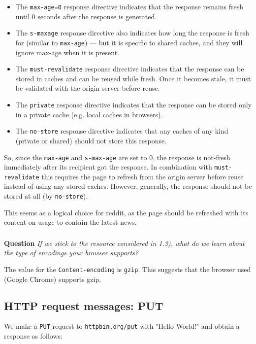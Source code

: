 \documentclass{article}
\begin{document}
\begin{itemize}
    \item The \texttt{max-age=0} response directive indicates that the response remains fresh until 0 seconds after the response is generated.
    \item The \texttt{s-maxage} response directive also indicates how long the response is fresh for (similar to \texttt{max-age}) — but it is specific to shared caches, and they will ignore max-age when it is present.
    \item The \texttt{must-revalidate} response directive indicates that the response can be stored in caches and can be reused while fresh. Once it becomes stale, it must be validated with the origin server before reuse.
    \item The \texttt{private} response directive indicates that the response can be stored only in a private cache (e.g. local caches in browsers).
    \item The \texttt{no-store} response directive indicates that any caches of any kind (private or shared) should not store this response.
\end{itemize}


So, since the \texttt{max-age} and \texttt{s-max-age} are set to 0, the response is not-fresh immediately after its recipient got the response. In combination with \texttt{must-revalidate} this requires the page to refresh from the origin server before reuse instead of using any stored caches. However, generally, the response should not be stored at all (by \texttt{no-store}). 

This seems as a logical choice for reddit, as the page should be refreshed with its content on usage to contain the latest news.

\subsubsection{}
\textbf{Question} \textit{If we stick to the resource considered in 1.3), what do we learn about the type of encodings your browser supports?}

The value for the \texttt{Content-encoding} is \texttt{gzip}. This suggests that the browser used (Google Chrome) supports gzip. 

\subsection{HTTP request messages: PUT}

We make a \texttt{PUT} request to \texttt{httpbin.org/put} with "Hello World!" and obtain a response as follows:
\end{document}
